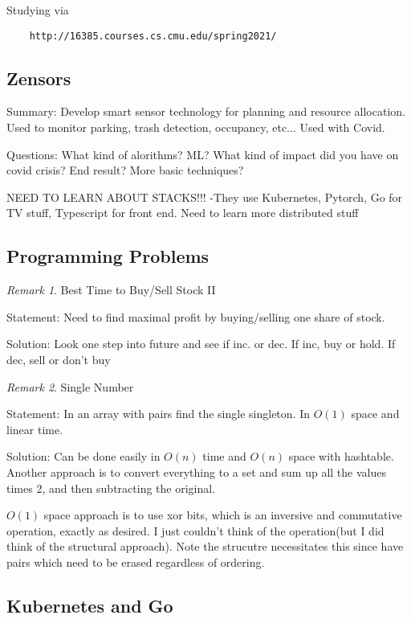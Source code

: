 \documentclass[11pt]{article}
\theoremstyle{remark}
\newtheorem{remark}{Remark}
\begin{document}
Studying via

\begin{verbatim}
	http://16385.courses.cs.cmu.edu/spring2021/
\end{verbatim}

\subsection{Zensors}

Summary: Develop smart sensor technology for planning and resource allocation. Used to monitor parking, trash detection, occupancy, etc... Used with Covid.

Questions: What kind of alorithms? ML? What kind of impact did you have on covid crisis? End result? More basic techniques?

NEED TO LEARN ABOUT STACKS!!!
-They use Kubernetes, Pytorch, Go for TV stuff, Typescript for front end. Need to learn more distributed stuff

\subsection{Programming Problems}

\begin{remark}
	Best Time to Buy/Sell Stock II
\end{remark}

Statement: Need to find maximal profit by buying/selling one share of stock. 

Solution: Look one step into future and see if inc. or dec. If inc, buy or hold. If dec, sell or don't buy

\begin{remark}
	Single Number
\end{remark}

Statement: In an array with pairs find the single singleton. In $O(1)$ space and linear time.

Solution: Can be done easily in $O(n)$ time and $O(n)$ space with hashtable. Another approach is to convert everything to a set and sum up all the values times 2, and then subtracting the original.

$O(1)$ space approach is to use xor bits, which is an inversive and commutative operation, exactly as desired. I just couldn't think of the operation(but I did think of the structural approach). Note the strucutre necessitates this since have pairs which need to be erased regardless of ordering.

\subsection{Kubernetes and Go}
\end{document}
